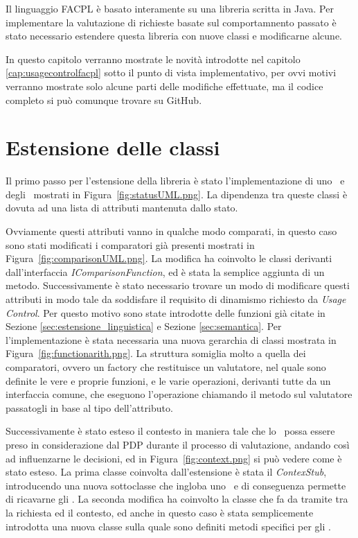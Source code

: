 \label{cap:estensione_libreria}

Il linguaggio FACPL è basato interamente su una libreria scritta in Java. 
Per implementare la valutazione di richieste basate sul comportamnento passato è stato necessario estendere questa libreria con nuove classi e modificarne alcune.\\ \par
In questo capitolo verranno mostrate le novità introdotte nel capitolo \ref{cap:usagecontrolfacpl} sotto il punto di vista implementativo, per ovvi motivi verranno mostrate solo alcune parti delle modifiche effettuate, ma il codice completo si può comunque trovare su GitHub.


\section{Estensione delle classi}
\label{sec:estensione_gerarchia}
Il primo passo per l'estensione della libreria è stato l'implementazione di uno \status \  e degli \statusattribute \ mostrati in Figura~\ref{fig:statusUML.png}.
La dipendenza tra queste classi è dovuta ad una lista di attributi mantenuta dallo stato. \\ \par
Ovviamente questi attributi vanno in qualche modo comparati, in questo caso sono stati modificati i comparatori già presenti mostrati in Figura~\ref{fig:comparisonUML.png}. La modifica ha coinvolto le classi derivanti dall'interfaccia \textit{IComparisonFunction}, ed è stata la semplice aggiunta di un metodo.
Successivamente è stato necessario trovare un modo di modificare questi attributi in modo tale da soddisfare il requisito di dinamismo richiesto da \textit{Usage Control}. 
Per questo motivo sono state introdotte delle funzioni già citate in Sezione \ref{sec:estensione_linguistica} e Sezione \ref{sec:semantica}. Per l'implementazione è stata necessaria una nuova gerarchia di classi mostrata in Figura~\ref{fig:functionarith.png}. La struttura somiglia molto a quella dei comparatori, ovvero un factory che restituisce un valutatore, nel quale sono definite le vere e proprie funzioni, e le varie operazioni, derivanti tutte da un interfaccia comune, che eseguono l'operazione chiamando il metodo sul valutatore passatogli in base al tipo dell'attributo.\\ \par
Successivamente è stato esteso il contesto in maniera tale che lo \status \ possa essere preso in considerazione dal PDP durante il processo di valutazione, andando così ad influenzarne le decisioni, ed in Figura~\ref{fig:context.png} si può vedere come è stato esteso. La prima classe coinvolta dall'estensione è stata il \textit{ContexStub}, introducendo una nuova sottoclasse che ingloba uno \status \ e di conseguenza permette di ricavarne gli \statusattribute. La seconda modifica ha coinvolto la classe che fa da tramite tra la richiesta ed il contesto, ed anche in questo caso è stata semplicemente introdotta una nuova classe sulla quale sono definiti metodi specifici per gli \statusattribute. \\ \par
